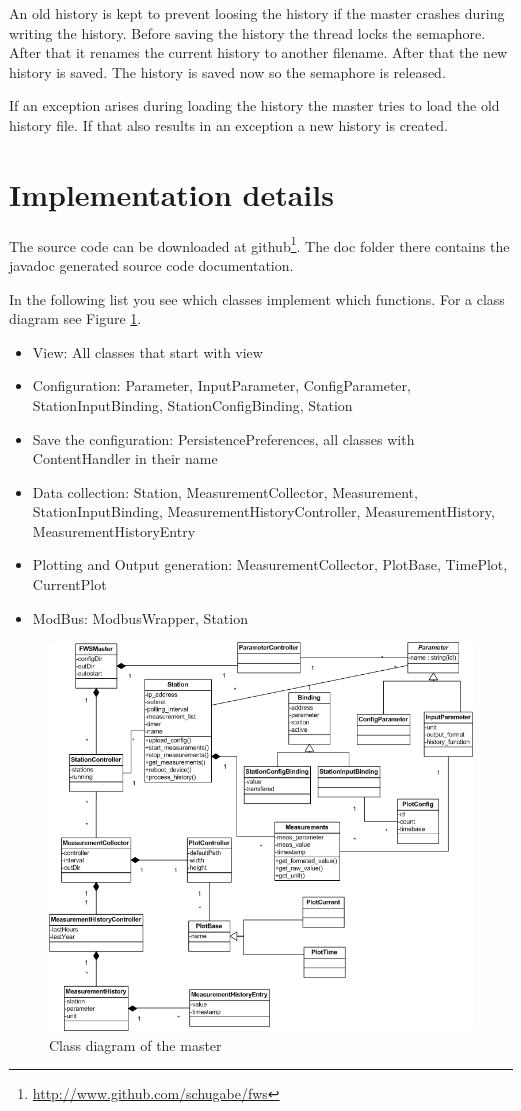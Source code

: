 An old history is kept to prevent loosing the history if the master crashes during writing the history. Before saving the history the thread locks the semaphore. After that it renames the current history to another filename. After that the new history is saved. The history is saved now so the semaphore is released.

If an exception arises during loading the history the master tries to load the old history file. If that also results in an exception a new history is created.

\section{Implementation details} %
\label{sec:implementation_details}
The source code can be downloaded at github\footnote{\url{http://www.github.com/schugabe/fws}}. The doc folder there contains the javadoc generated source code documentation.

In the following list you see which classes implement which functions. For a class diagram see Figure \ref{fig:class_master}.

\begin{itemize}
    \item View: All classes that start with view
    \item Configuration: Parameter, InputParameter, ConfigParameter, StationInputBinding, StationConfigBinding, Station
    \item Save the configuration: PersistencePreferences, all classes with ContentHandler in their name
    \item Data collection: Station, MeasurementCollector, Measurement, StationInputBinding, MeasurementHistoryController, MeasurementHistory, MeasurementHistoryEntry
    \item Plotting and Output generation: MeasurementCollector, PlotBase, TimePlot, CurrentPlot
    \item ModBus: ModbusWrapper, Station
\end{itemize}

\begin{figure}[ht]
    \centering
    \includegraphics[width=\linewidth]{master/class.png}
    \caption{Class diagram of the master}
    \label{fig:class_master}
\end{figure}


